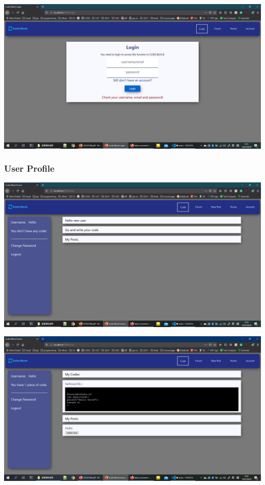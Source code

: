 \includegraphics[scale=0.4]{Doc/Pics/login_msg.png}

\subsubsection{User Profile}
\includegraphics[scale=0.4]{Doc/Pics/new_user.png}

\includegraphics[scale=0.4]{Doc/Pics/user_with_code.png}

